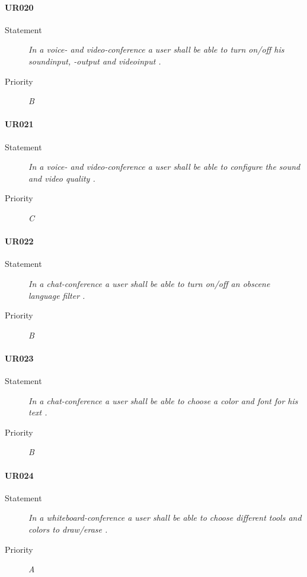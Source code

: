 \paragraph{UR020}
  \begin{description}
  \item [Statement] 
    \textit{ In a voice- and video-\gls{conference} a \gls{user} shall be able to turn on/off his soundinput, -output and videoinput
    .}
  \item [Priority] \textit{B}
\end{description}
    
\paragraph{UR021}
  \begin{description}
  \item [Statement] 
    \textit{ In a voice- and video-\gls{conference} a \gls{user} shall be able to configure the sound and video quality
    .}
  \item [Priority] \textit{C}
\end{description}
    
\paragraph{UR022}
  \begin{description}
  \item [Statement] 
    \textit{ In a chat-\gls{conference} a \gls{user} shall be able to turn on/off an obscene language filter 
    .}
  \item [Priority] \textit{B}
\end{description}
    
\paragraph{UR023}
  \begin{description}
  \item [Statement] 
    \textit{ In a chat-\gls{conference} a \gls{user} shall be able to choose a color and font for his text
    .}
  \item [Priority] \textit{B}
\end{description} 
    
\paragraph{UR024}
  \begin{description}
  \item [Statement] 
    \textit{ In a whiteboard-\gls{conference} a \gls{user} shall be able to choose different tools and colors to draw/erase
    .}
  \item [Priority] \textit{A}
\end{description}
    

